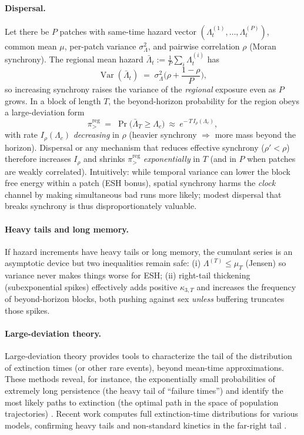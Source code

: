 \documentclass[11pt]{article}
\theoremstyle{upright}
\newcommand{\Var}{\operatorname{Var}}
\newcommand{\hazT}[1]{\Lambda^{(#1)}}          %
\begin{document}
\paragraph{Dispersal.}
Let there be $P$ patches with same-time hazard vector $(\Lambda_t^{(1)},\dots,\Lambda_t^{(P)})$,
common mean $\mu$, per-patch variance $\sigma_\Lambda^2$, and pairwise correlation $\rho$ (Moran
synchrony). The regional mean hazard $\bar\Lambda_t:=\tfrac{1}{P}\sum_i \Lambda_t^{(i)}$ has
\[
\Var(\bar\Lambda_t)\;=\;\sigma_\Lambda^2\Big(\rho+\frac{1-\rho}{P}\Big),
\]
so increasing synchrony raises the variance of the \emph{regional} exposure even as $P$ grows. In a
block of length $T$, the beyond-horizon probability for the region obeys a large-deviation form
\[
\pi_{>}^{\mathrm{reg}} \;=\; \Pr\!\big(\bar\Lambda_T\ge \Lambda_c\big)\ \approx\ e^{-\,T\,I_\rho(\Lambda_c)},
\]
with rate $I_\rho(\Lambda_c)$ \emph{decreasing} in $\rho$ (heavier synchrony $\Rightarrow$ more mass
beyond the horizon). Dispersal or any mechanism that reduces effective synchrony ($\rho'\!<\rho$)
therefore increases $I_\rho$ and shrinks $\pi_{>}^{\mathrm{reg}}$ \emph{exponentially} in $T$ (and in $P$
when patches are weakly correlated). Intuitively: while temporal variance can lower the block free
energy within a patch (ESH bonus), spatial synchrony harms the \emph{clock} channel by making
simultaneous bad runs more likely; modest dispersal that breaks synchrony is thus disproportionately
valuable.

\paragraph{Heavy tails and long memory.}
If hazard increments have heavy tails or long memory, the cumulant series is an asymptotic device but two inequalities remain safe: (i) $\hazT{T}\le \mu_T$ (Jensen) so variance never makes things worse for ESH; (ii) right-tail thickening (subexponential spikes) effectively adds positive $\kappa_{3,T}$ and increases the frequency of beyond-horizon blocks, both pushing against sex \emph{unless} buffering truncates those spikes.

\paragraph{Large-deviation theory.}
Large-deviation theory provides tools to characterize the tail of the distribution of extinction times (or other rare events), beyond mean-time approximations. These methods reveal, for instance, the exponentially small probabilities of extremely long persistence (the heavy tail of “failure times”) and identify the most likely paths to extinction (the optimal path in the space of population trajectories) \citep{Ovaskainen2010}. Recent work computes full extinction-time distributions for various models, confirming heavy tails and non-standard kinetics in the far-right tail \citep{Kessler2023}.
\end{document}
